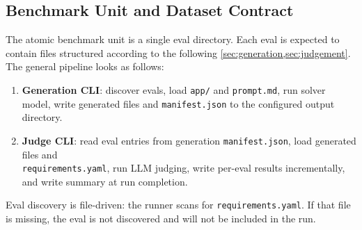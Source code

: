 \documentclass[11pt]{article}
\begin{document}
\subsection{Benchmark Unit and Dataset Contract}
The atomic benchmark unit is a single eval directory. Each eval is expected to contain files structured according to the following \cref{sec:generation,sec:judgement}. The general pipeline looks as follows:
\begin{enumerate}
  \item \textbf{Generation CLI}: discover evals, load \texttt{app/} and \texttt{prompt.md}, run solver model, write generated files and \texttt{manifest.json} to the configured output directory.
  \item \textbf{Judge CLI}: read eval entries from generation \texttt{manifest.json}, load generated files and \\\texttt{requirements.yaml}, run LLM judging, write per-eval results incrementally, and write summary at run completion.
\end{enumerate}

Eval discovery is file-driven: the runner scans for \texttt{requirements.yaml}. If that file is missing, the eval is not discovered and will not be included in the run.
\end{document}
